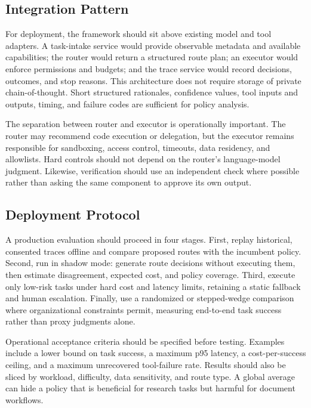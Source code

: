 \documentclass[sigconf]{acmart}
\begin{document}
\subsection{Integration Pattern}

For deployment, the framework should sit above existing model and tool adapters. A task-intake service would provide observable metadata and available capabilities; the router would return a structured route plan; an executor would enforce permissions and budgets; and the trace service would record decisions, outcomes, and stop reasons. This architecture does not require storage of private chain-of-thought. Short structured rationales, confidence values, tool inputs and outputs, timing, and failure codes are sufficient for policy analysis.

The separation between router and executor is operationally important. The router may recommend code execution or delegation, but the executor remains responsible for sandboxing, access control, timeouts, data residency, and allowlists. Hard controls should not depend on the router's language-model judgment. Likewise, verification should use an independent check where possible rather than asking the same component to approve its own output.

\subsection{Deployment Protocol}

A production evaluation should proceed in four stages. First, replay historical, consented traces offline and compare proposed routes with the incumbent policy. Second, run in shadow mode: generate route decisions without executing them, then estimate disagreement, expected cost, and policy coverage. Third, execute only low-risk tasks under hard cost and latency limits, retaining a static fallback and human escalation. Finally, use a randomized or stepped-wedge comparison where organizational constraints permit, measuring end-to-end task success rather than proxy judgments alone.

Operational acceptance criteria should be specified before testing. Examples include a lower bound on task success, a maximum p95 latency, a cost-per-success ceiling, and a maximum unrecovered tool-failure rate. Results should also be sliced by workload, difficulty, data sensitivity, and route type. A global average can hide a policy that is beneficial for research tasks but harmful for document workflows.
\end{document}
